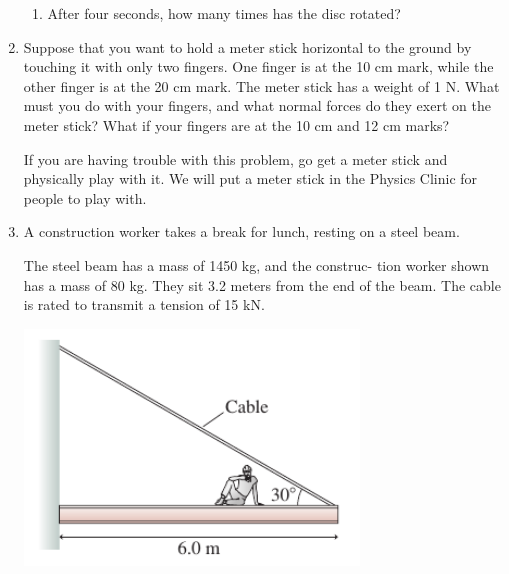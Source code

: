 \documentclass[12pt]{article}
\begin{document}
\begin{enumerate}
\begin{enumerate}
		\item After four seconds, how many times has the disc rotated?
		
%		
	\end{enumerate}

	\bigskip
	\bigskip
	
	\item Suppose that you want to hold a meter stick horizontal to the ground by touching it
	with only two fingers. One finger is at the 10 cm mark, while the other finger is at the
	20 cm mark. The meter stick has a weight of 1 N. What must you do with your fingers,
	and what normal forces do they exert on the meter stick?
	What if your fingers are at the 10 cm and 12 cm marks?
	
	If you are having trouble
	with this problem, go get a meter stick and physically play with it. We will put a meter stick in the Physics Clinic for people to play with.
	\bigskip
	\bigskip
	\newpage
	
	 \item A construction worker takes a break for lunch, resting on a steel beam.
	
	\begin{minipage}{0.5\textwidth}
		The steel
		beam has a mass of 1450 kg, and the construc-
		tion worker shown has a mass of 80 kg. They sit
		3.2 meters from the end of the beam. The cable is rated to transmit a tension of 15 kN.
	\end{minipage}
	\begin{minipage}{0.5\textwidth}
		\begin{center}
			\includegraphics[width=0.7\textwidth]{person-on-girder.png}
		\end{center}
	\end{minipage}
	

\end{enumerate}
\end{document}
